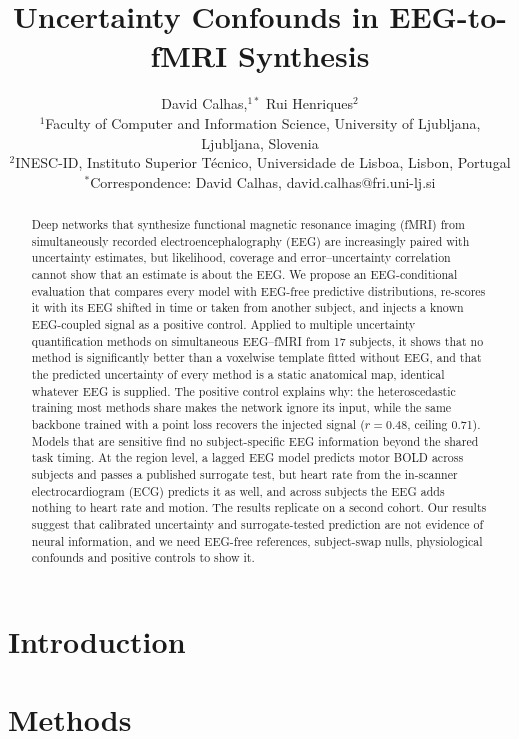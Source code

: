 \documentclass[]{imag-ms-template}
\title{Uncertainty Confounds in EEG-to-fMRI Synthesis}
\author{David Calhas,$^{1\ast}$ Rui Henriques$^{2}$\\
{\small $^{1}$Faculty of Computer and Information Science, University of Ljubljana, Ljubljana, Slovenia}\\
{\small $^{2}$INESC-ID, Instituto Superior T\'{e}cnico, Universidade de Lisboa, Lisbon, Portugal}\\
{\small $^\ast$Correspondence: David Calhas, david.calhas@fri.uni-lj.si}
}
\date{}
\begin{document}
\maketitle


\begin{abstract}
Deep networks that synthesize functional magnetic resonance imaging (fMRI) from simultaneously recorded electroencephalography (EEG) are increasingly paired with uncertainty estimates, but likelihood, coverage and error--uncertainty correlation cannot show that an estimate is about the EEG. We propose an EEG-conditional evaluation that compares every model with EEG-free predictive distributions, re-scores it with its EEG shifted in time or taken from another subject, and injects a known EEG-coupled signal as a positive control. Applied to multiple uncertainty quantification methods on simultaneous EEG--fMRI from 17 subjects, it shows that no method is significantly better than a voxelwise template fitted without EEG, and that the predicted uncertainty of every method is a static anatomical map, identical whatever EEG is supplied. The positive control explains why: the heteroscedastic training most methods share makes the network ignore its input, while the same backbone trained with a point loss recovers the injected signal ($r=0.48$, ceiling 0.71). Models that are sensitive find no subject-specific EEG information beyond the shared task timing. At the region level, a lagged EEG model predicts motor BOLD across subjects and passes a published surrogate test, but heart rate from the in-scanner electrocardiogram (ECG) predicts it as well, and across subjects the EEG adds nothing to heart rate and motion. The results replicate on a second cohort. Our results suggest that calibrated uncertainty and surrogate-tested prediction are not evidence of neural information, and we need EEG-free references, subject-swap nulls, physiological confounds and positive controls to show it.
\end{abstract}

\section{Introduction}\label{sec:introduction}


\section{Methods}\label{sec:methodsall}

\end{document}

